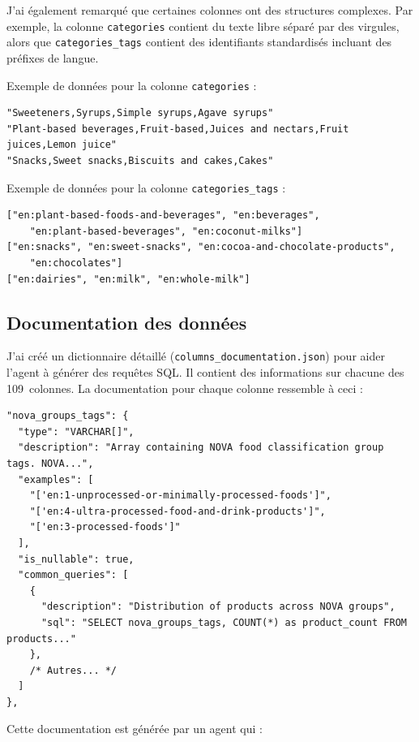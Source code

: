 \documentclass[a4paper,11pt]{article}
\begin{document}
J'ai également remarqué que certaines colonnes ont des structures complexes. 
Par exemple, la colonne \texttt{categories} contient du texte libre séparé par des virgules, alors que \texttt{categories\_tags} contient des identifiants standardisés incluant des préfixes de langue.

Exemple de données pour la colonne \texttt{categories} :

\begin{lstlisting}
"Sweeteners,Syrups,Simple syrups,Agave syrups"
"Plant-based beverages,Fruit-based,Juices and nectars,Fruit juices,Lemon juice"
"Snacks,Sweet snacks,Biscuits and cakes,Cakes"
\end{lstlisting}

Exemple de données pour la colonne \texttt{categories\_tags} :

\begin{lstlisting}
["en:plant-based-foods-and-beverages", "en:beverages", 
    "en:plant-based-beverages", "en:coconut-milks"]
["en:snacks", "en:sweet-snacks", "en:cocoa-and-chocolate-products", 
    "en:chocolates"]
["en:dairies", "en:milk", "en:whole-milk"]
\end{lstlisting}




\subsection{Documentation des données}

J'ai créé un dictionnaire détaillé
(\texttt{columns\_documentation.json}) pour aider l'agent à générer des requêtes SQL. Il contient des informations sur chacune des 109~colonnes.
La documentation pour chaque colonne ressemble à ceci :

\newpage
\begin{lstlisting}
"nova_groups_tags": {
  "type": "VARCHAR[]",
  "description": "Array containing NOVA food classification group tags. NOVA...",
  "examples": [
    "['en:1-unprocessed-or-minimally-processed-foods']",
    "['en:4-ultra-processed-food-and-drink-products']",
    "['en:3-processed-foods']"
  ],
  "is_nullable": true,
  "common_queries": [
    {
      "description": "Distribution of products across NOVA groups",
      "sql": "SELECT nova_groups_tags, COUNT(*) as product_count FROM products..."
    },
    /* Autres... */
  ]
},
\end{lstlisting}

Cette documentation est générée par un agent qui :
\end{document}
